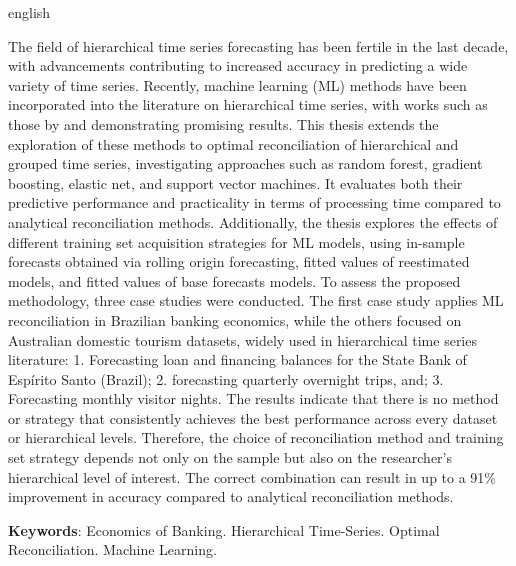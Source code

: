 \begin{resumo}[Abstract]
  \begin{otherlanguage*}{english}
    
    The field of hierarchical time series forecasting has been fertile in the last decade, with advancements contributing to increased accuracy in predicting a wide variety of time series. Recently, machine learning (ML) methods have been incorporated into the literature on hierarchical time series, with works such as those by \textcite{spiliotis_hierarchical_2021} and \textcite{makridakis_m5_2022} demonstrating promising results. This thesis extends the exploration of these methods to optimal reconciliation of hierarchical and grouped time series, investigating approaches such as random forest, gradient boosting, elastic net, and support vector machines. It evaluates both their predictive performance and practicality in terms of processing time compared to analytical reconciliation methods. Additionally, the thesis explores the effects of different training set acquisition strategies for ML models, using in-sample forecasts obtained via rolling origin forecasting, fitted values of reestimated models, and fitted values of base forecasts models. To assess the proposed methodology, three case studies were conducted. The first case study applies ML reconciliation in Brazilian banking economics, while the others focused on Australian domestic tourism datasets, widely used in hierarchical time series literature: 1. Forecasting loan and financing balances for the State Bank of Espírito Santo (Brazil); 2. forecasting quarterly overnight trips, and; 3. Forecasting monthly visitor nights. The results indicate that there is no method or strategy that consistently achieves the best performance across every dataset or hierarchical levels. Therefore, the choice of reconciliation method and training set strategy depends not only on the sample but also on the researcher's hierarchical level of interest. The correct combination can result in up to a 91\% improvement in accuracy compared to analytical reconciliation methods.
    \vspace{\onelineskip}
 
    \noindent 
    \textbf{Keywords}: Economics of Banking. Hierarchical Time-Series. Optimal Reconciliation. Machine Learning.
  \end{otherlanguage*}
\end{resumo}

\listoffigures*
\cleardoublepage

